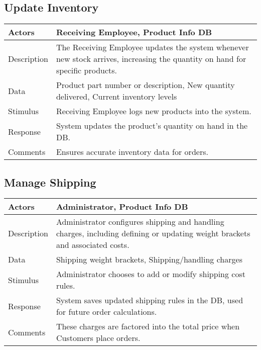 \documentclass{report}
\begin{document}
    \pagebreak 
    \subsection{Update Inventory}
    \bigbreak \noindent 
    \begin{center}
    \begin{tabular}{|p{4cm}|p{8cm}|}
        \hline
        Actors & 
        Receiving Employee, Product Info DB\\
        \hline
        Description & 
        The Receiving Employee updates the system whenever new stock 
        arrives, increasing the quantity on hand for specific products. \\
        \hline
        Data & 
        Product part number or description, New quantity delivered, Current inventory levels \\
        \hline
        Stimulus & 
        Receiving Employee logs new products into the system. \\
        \hline
        Response & 
        System updates the product’s quantity on hand in the DB. \\
        \hline
        Comments & 
        Ensures accurate inventory data for orders.  \\
        \hline
    \end{tabular}
\end{center}

    \pagebreak 
    \subsection{Manage Shipping}
    \bigbreak \noindent 
    \begin{center}
        \begin{tabular}{|p{4cm}|p{9cm}|}
            \hline
            Actors & 
            Administrator, Product Info DB \\
            \hline
            Description & 
            Administrator configures shipping and handling charges, including 
            defining or updating weight brackets and associated costs. \\
            \hline
            Data & Shipping weight brackets, Shipping/handling charges \\
            \hline
            Stimulus & 
            Administrator chooses to add or modify shipping cost rules. \\
            \hline
            Response & 
            System saves updated shipping rules in the DB, 
            used for future order calculations. \\
            \hline
            Comments & 
            These charges are factored into the total price when Customers 
            place orders. \\
            \hline
        \end{tabular}
    \end{center}
\end{document}
